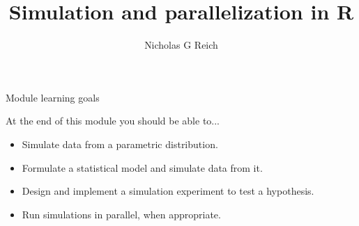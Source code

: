 

\title{Simulation and parallelization in R}
\newcommand{\ModuleShortname}{simPar}
\author{Nicholas G Reich}
\newcommand{\LicenseText}{Made available under the Creative Commons Attribution-ShareAlike 3.0 Unported License: http://creativecommons.org/licenses/by-sa/3.0/deed.en\textunderscore US }
\newcommand{\Instructor}{}
\newcommand{\Course}{}






\begin{frame}[plain]
	\titlepage
\end{frame}



\begin{frame}{Module learning goals}

	\begin{block}{At the end of this module you should be able to...}
		

		\begin{itemize}

			\item{Simulate data from a parametric distribution.}

			\item{Formulate a statistical model and simulate data from it.}

			\item{Design and implement a simulation experiment to test a hypothesis.}
                        
                        \item{Run simulations in parallel, when appropriate.}
                        
		\end{itemize}

	\end{block}

\end{frame}



